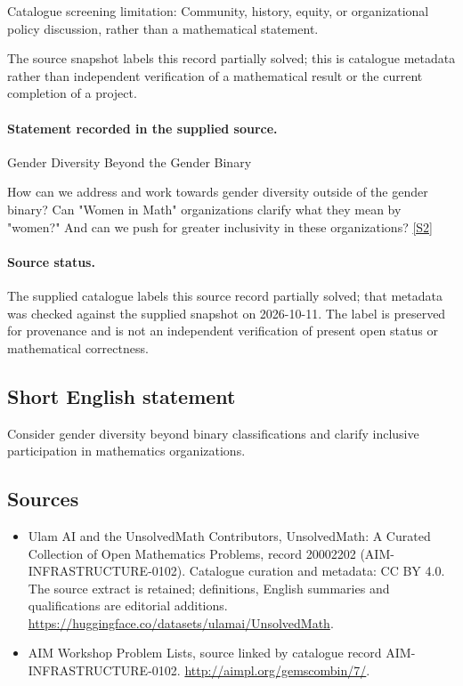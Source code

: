 \documentclass[11pt]{article}
\begin{document}
Catalogue screening limitation: Community, history, equity, or organizational policy discussion, rather than a mathematical statement.

The source snapshot labels this record partially solved; this is catalogue metadata rather than independent verification of a mathematical result or the current completion of a project.
\paragraph{Statement recorded in the supplied source.}
Gender Diversity Beyond the Gender Binary

How can we address and work towards gender diversity outside of the gender binary? Can "Women in Math" organizations clarify what they mean by "women?" And can we push for greater inclusivity in these organizations? \href{http://aimpl.org/gemscombin/7/}{[S2]}
\paragraph{Source status.}
The supplied catalogue labels this source record partially solved; that metadata was checked against the supplied snapshot on 2026-10-11. The label is preserved for provenance and is not an independent verification of present open status or mathematical correctness.
\subsection{Short English statement}
Consider gender diversity beyond binary classifications and clarify inclusive participation in mathematics organizations.
\subsection{Sources}
\begin{itemize}
\item[S1] Ulam AI and the UnsolvedMath Contributors, UnsolvedMath: A Curated Collection of Open Mathematics Problems, record 20002202 (AIM-INFRASTRUCTURE-0102). Catalogue curation and metadata: CC BY 4.0. The source extract is retained; definitions, English summaries and qualifications are editorial additions.
\url{https://huggingface.co/datasets/ulamai/UnsolvedMath}.
\item[S2] AIM Workshop Problem Lists, source linked by catalogue record AIM-INFRASTRUCTURE-0102.
\url{http://aimpl.org/gemscombin/7/}.
\end{itemize}
\end{document}
